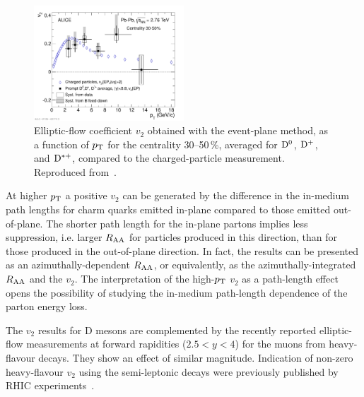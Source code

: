\begin{figure}
\centering
\includegraphics[width=0.5\textwidth]{heavyflavorfigs/DmesonV2.pdf}
\caption{Elliptic-flow coefficient $v_2$ obtained with the event-plane method, as a function of $p_{\rm T}$ for the centrality 30--50\,\%, averaged for ${\rm D}^0$, ${\rm D}^+$, and ${\rm D}^{*+}$, compared to the charged-particle measurement. Reproduced from~\cite{Abelev:2013lca}.}
\label{figks:DmesonV2}
\end{figure}

At higher $p_{\rm T}$ a positive $v_2$ can be generated by the difference in the in-medium path lengths for charm quarks emitted in-plane compared to those emitted out-of-plane. The shorter path length for the in-plane partons implies less suppression, i.e. larger $R_{\rm AA}$ for particles produced in this direction, than for those produced in the out-of-plane direction. In fact, the results can be presented as an azimuthally-dependent $R_{\rm AA}$, or equivalently, as the azimuthally-integrated $R_{\rm AA}$ and the $v_2$. The interpretation of the high-$p_{\rm T}$ $v_2$ as a path-length effect opens the possibility of studying  the in-medium path-length dependence of the parton energy loss.

The $v_2$ results for D mesons are complemented by the recently reported elliptic-flow measurements at forward rapidities ($2.5 < y < 4$) for the muons from heavy-flavour decays. They show an effect of similar magnitude. Indication of non-zero heavy-flavour $v_2$ using the semi-leptonic decays were previously published by RHIC experiments~\cite{Adler:2005ab,Adare:2006nq}. 